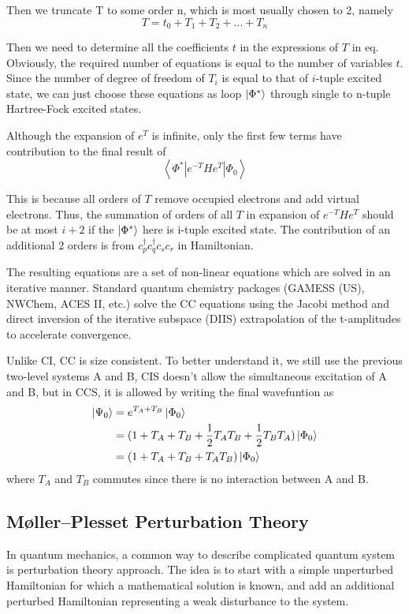 Then we truncate T to some order n, which is most usually chosen to 2, namely
$$
T=t_0+T_1+T_2+ \dots +T_n
$$

Then we need to determine all the coefficients $t$ in the expressions of $T$ in eq.
Obviously, the required number of equations is equal to the number of variables $t$.
Since the number of degree of freedom of $T_i$ is equal to that of $i$-tuple excited state, we can just choose these equations as loop $\ket{\Phi^{*}}$ through single to n-tuple Hartree-Fock excited states.

Although the expansion of $e^T$ is infinite, only the first few terms have contribution to the final result of 
$$
\left\langle\Phi^{*}\left|e^{-T} H e^{T}\right| \Phi_{0}\right\rangle
$$

This is because all orders of $T$ remove occupied electrons and add virtual electrons.
Thus, the summation of orders of all $T$ in expansion of $e^{-T} H e^{T}$ should be at most $i+2$ if the $\ket{\Phi^{*}}$ here is i-tuple excited state.
The contribution of an additional 2 orders is from $c_{p}^{\dagger} c_{q}^{\dagger} c_{s} c_{r}$ in Hamiltonian.

The resulting equations are a set of non-linear equations which are solved in an iterative manner. 
Standard quantum chemistry packages (GAMESS (US), NWChem, ACES II, etc.) solve the CC equations using the Jacobi method and direct inversion of the iterative subspace (DIIS) extrapolation of the t-amplitudes to accelerate convergence.

Unlike CI, CC is size consistent.
To better understand it, we still use the previous two-level systems A and B, CIS doesn't allow the simultaneous excitation of A and B, but in CCS, it is allowed by writing the final wavefuntion as 
$$
\begin{aligned}
	\ket{\Psi_0}&=e^{T_A+T_B}\ket{\Phi_0}
	\\
	&=(1+T_A+T_B+\frac{1}{2}T_AT_B+\frac{1}{2}T_BT_A)\ket{\Phi_0}
	\\
	&=(1+T_A+T_B+T_AT_B)\ket{\Phi_0}
\end{aligned}
$$
where $T_A$ and $T_B$ commutes since there is no interaction between A and B.

\subsection{M{\o}ller–Plesset Perturbation Theory}
In quantum mechanics, a common way to describe complicated quantum system is perturbation theory approach.
The idea is to start with a simple unperturbed Hamiltonian for which a mathematical solution is known, and add an additional perturbed Hamiltonian representing a weak disturbance to the system.


